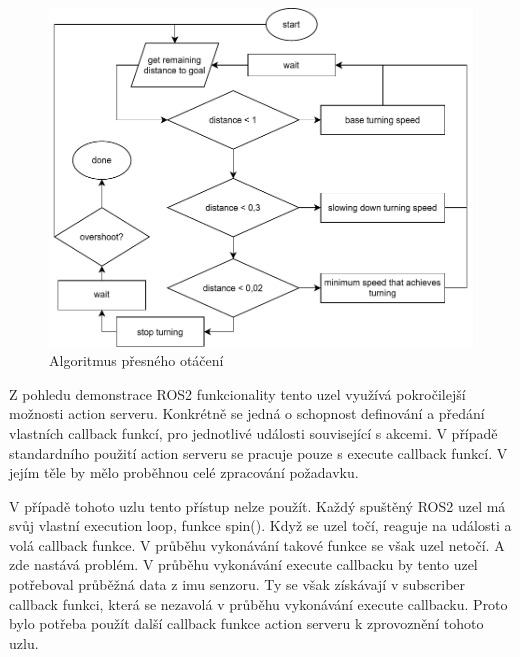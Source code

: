 \begin{figure}[h!]
	\centering
	\includegraphics[scale=0.75]{obrazky-figures/precise_turning.pdf}
	\caption{Algoritmus přesného otáčení}
	\label{}
\end{figure}

Z pohledu demonstrace ROS2 funkcionality tento uzel využívá pokročilejší možnosti action serveru. Konkrétně se jedná o schopnost definování a předání vlastních callback funkcí, pro jednotlivé události související s akcemi. V případě standardního použití action serveru se pracuje pouze s execute callback funkcí. V jejím těle by mělo proběhnou celé zpracování požadavku.

V případě tohoto uzlu tento přístup nelze použít. Každý spuštěný ROS2 uzel má svůj vlastní execution loop, funkce spin(). Když se uzel točí, reaguje na události a volá callback funkce. V průběhu vykonávání takové funkce se však uzel netočí. A zde nastává problém. V průběhu vykonávání execute callbacku by tento uzel potřeboval průběžná data z imu senzoru. Ty se však získávají v subscriber callback funkci, která se nezavolá v průběhu vykonávání execute callbacku. Proto bylo potřeba použít další callback funkce action serveru k zprovoznění tohoto uzlu. 
 
